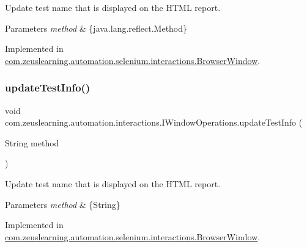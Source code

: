 Update test name that is displayed on the H\+T\+ML report.


\begin{DoxyParams}{Parameters}
{\em method} & \{java.\+lang.\+reflect.\+Method\} \\
\hline
\end{DoxyParams}


Implemented in \hyperlink{classcom_1_1zeuslearning_1_1automation_1_1selenium_1_1interactions_1_1BrowserWindow_a7cc2714d601bc96f3d9262b662b27a2e}{com.\+zeuslearning.\+automation.\+selenium.\+interactions.\+Browser\+Window}.

\hypertarget{interfacecom_1_1zeuslearning_1_1automation_1_1interactions_1_1IWindowOperations_aa9d371c94ab4c3ba4c1d9cdca0fc4532}{}\label{interfacecom_1_1zeuslearning_1_1automation_1_1interactions_1_1IWindowOperations_aa9d371c94ab4c3ba4c1d9cdca0fc4532} 
\subsubsection{\texorpdfstring{update\+Test\+Info()}{updateTestInfo()}\hspace{0.1cm}{\footnotesize\ttfamily [2/2]}}
{\footnotesize\ttfamily void com.\+zeuslearning.\+automation.\+interactions.\+I\+Window\+Operations.\+update\+Test\+Info (\begin{DoxyParamCaption}\item[{String}]{method }\end{DoxyParamCaption})}

Update test name that is displayed on the H\+T\+ML report.


\begin{DoxyParams}{Parameters}
{\em method} & \{String\} \\
\hline
\end{DoxyParams}


Implemented in \hyperlink{classcom_1_1zeuslearning_1_1automation_1_1selenium_1_1interactions_1_1BrowserWindow_ac5cee2e884ceca2b0d7367e40aff6942}{com.\+zeuslearning.\+automation.\+selenium.\+interactions.\+Browser\+Window}.

\hypertarget{interfacecom_1_1zeuslearning_1_1automation_1_1interactions_1_1IWindowOperations_a9908b638a8d279ad70831154e366f080}{}\label{interfacecom_1_1zeuslearning_1_1automation_1_1interactions_1_1IWindowOperations_a9908b638a8d279ad70831154e366f080} 
